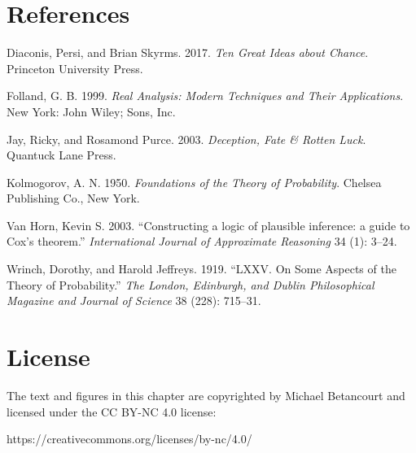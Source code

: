 \documentclass[
  letterpaper,
  DIV=11,
  numbers=noendperiod]{scrartcl}
\newlength{\cslhangindent}
\newenvironment{CSLReferences}[2] %
 {\begin{list}{}{%
  \setlength{\itemindent}{0pt}
  \setlength{\leftmargin}{0pt}
  \setlength{\parsep}{0pt}
  \ifodd #1
   \setlength{\leftmargin}{\cslhangindent}
   \setlength{\itemindent}{-1\cslhangindent}
  \fi
  \setlength{\itemsep}{#2\baselineskip}}}
 {\end{list}}
\begin{document}
\section*{References}\label{references}

\label{refs}
\begin{CSLReferences}{1}{0}
Diaconis, Persi, and Brian Skyrms. 2017. \emph{Ten Great Ideas about
Chance}. Princeton University Press.

Folland, G. B. 1999. \emph{Real Analysis: Modern Techniques and Their
Applications}. New York: John Wiley; Sons, Inc.

Jay, Ricky, and Rosamond Purce. 2003. \emph{Deception, Fate \& Rotten
Luck}. Quantuck Lane Press.

Kolmogorov, A. N. 1950. \emph{Foundations of the {T}heory of
{P}robability}. Chelsea Publishing Co., New York.

Van Horn, Kevin S. 2003. {``{Constructing a logic of plausible
inference: a guide to {C}ox's theorem}.''} \emph{{International Journal
of Approximate Reasoning}} 34 (1): 3--24.

Wrinch, Dorothy, and Harold Jeffreys. 1919. {``LXXV. On Some Aspects of
the Theory of Probability.''} \emph{The London, Edinburgh, and Dublin
Philosophical Magazine and Journal of Science} 38 (228): 715--31.

\end{CSLReferences}

\section*{License}\label{license}

The text and figures in this chapter are copyrighted by Michael
Betancourt and licensed under the CC BY-NC 4.0 license:

https://creativecommons.org/licenses/by-nc/4.0/
\end{document}
